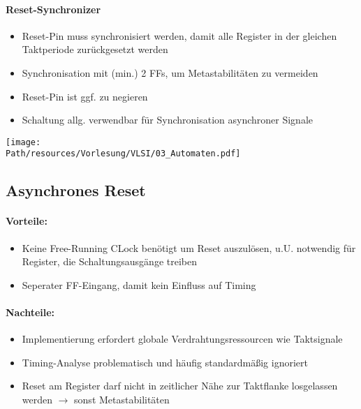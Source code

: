 	\paragraph{Reset-Synchronizer}
	\begin{itemize}
		\item Reset-Pin muss synchronisiert werden, damit alle Register in der gleichen Taktperiode zurückgesetzt werden
		\item Synchronisation mit (min.) 2 FFs, um Metastabilitäten zu vermeiden
		\item Reset-Pin ist ggf. zu negieren
		\item Schaltung allg. verwendbar für Synchronisation asynchroner Signale
	\end{itemize}
	\begin{center}
		\texttt{[image: \\Path/resources/Vorlesung/VLSI/03\_Automaten.pdf]}
	\end{center}
	
\subsection{Asynchrones Reset}
	\paragraph{Vorteile:}
	\begin{itemize}
		\item Keine Free-Running CLock benötigt um Reset auszulösen, u.U. notwendig für Register, die Schaltungsausgänge treiben
		\item Seperater FF-Eingang, damit kein Einfluss auf Timing
	\end{itemize}
	
	\paragraph{Nachteile:}
	\begin{itemize}
		\item Implementierung erfordert globale Verdrahtungsressourcen wie Taktsignale
		\item Timing-Analyse problematisch und häufig standardmäßig ignoriert
		\item Reset am Register darf nicht in zeitlicher Nähe zur Taktflanke losgelassen werden $\rightarrow$ sonst Metastabilitäten
	\end{itemize}
	
